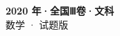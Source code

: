 \documentclass[zihao=-4, a4paper]{ctexart}
\begin{document}
\begin{center}
  {\Large\bfseries 2020 年·全国Ⅲ卷·文科}\\[4pt]
  {\large 数学 · 试题版}
\end{center}
\medskip
{}

\end{document}
